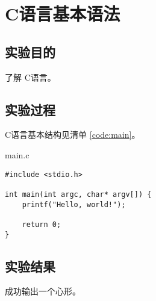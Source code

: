 \section{C语言基本语法}

\subsection{实验目的}
\par 了解 C语言。

\subsection{实验过程}
\par C语言基本结构见清单 \ref{code:main}。

\begin{code}
    \caption{main.c}
    \label{code:main}
    \begin{verbatim}
#include <stdio.h>

int main(int argc, char* argv[]) {
    printf("Hello, world!");

    return 0;
}
    \end{verbatim}
\end{code}

\subsection{实验结果}
\par 成功输出一个心形。